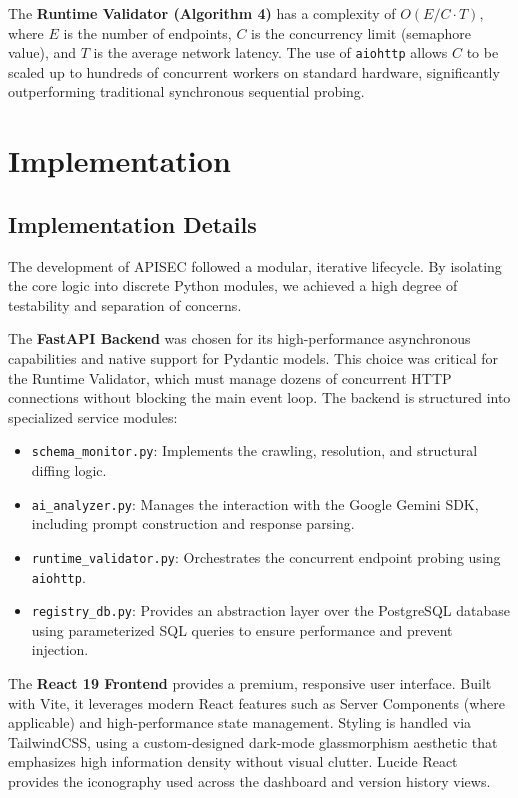 \documentclass{fisatprojectfinal}
\begin{document}
The \textbf{Runtime Validator (Algorithm 4)} has a complexity of $O(E/C \cdot T)$, where $E$ is the number of endpoints, $C$ is the concurrency limit (semaphore value), and $T$ is the average network latency. The use of \texttt{aiohttp} allows $C$ to be scaled up to hundreds of concurrent workers on standard hardware, significantly outperforming traditional synchronous sequential probing.


\chapter{Implementation}
\section{Implementation Details}
The development of APISEC followed a modular, iterative lifecycle. By isolating the core logic into discrete Python modules, we achieved a high degree of testability and separation of concerns.

The \textbf{FastAPI Backend} was chosen for its high-performance asynchronous capabilities and native support for Pydantic models. This choice was critical for the Runtime Validator, which must manage dozens of concurrent HTTP connections without blocking the main event loop. The backend is structured into specialized service modules:
\begin{itemize}
    \item \texttt{schema\_monitor.py}: Implements the crawling, resolution, and structural diffing logic.
    \item \texttt{ai\_analyzer.py}: Manages the interaction with the Google Gemini SDK, including prompt construction and response parsing.
    \item \texttt{runtime\_validator.py}: Orchestrates the concurrent endpoint probing using \texttt{aiohttp}.
    \item \texttt{registry\_db.py}: Provides an abstraction layer over the PostgreSQL database using parameterized SQL queries to ensure performance and prevent injection.
\end{itemize}

The \textbf{React 19 Frontend} provides a premium, responsive user interface. Built with Vite, it leverages modern React features such as Server Components (where applicable) and high-performance state management. Styling is handled via TailwindCSS, using a custom-designed dark-mode glassmorphism aesthetic that emphasizes high information density without visual clutter. Lucide React provides the iconography used across the dashboard and version history views.
\end{document}
